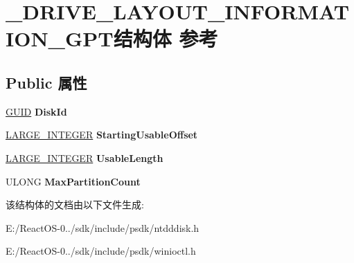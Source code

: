 \hypertarget{struct___d_r_i_v_e___l_a_y_o_u_t___i_n_f_o_r_m_a_t_i_o_n___g_p_t}{}\section{\+\_\+\+D\+R\+I\+V\+E\+\_\+\+L\+A\+Y\+O\+U\+T\+\_\+\+I\+N\+F\+O\+R\+M\+A\+T\+I\+O\+N\+\_\+\+G\+P\+T结构体 参考}
\label{struct___d_r_i_v_e___l_a_y_o_u_t___i_n_f_o_r_m_a_t_i_o_n___g_p_t}
\subsection*{Public 属性}
\begin{DoxyCompactItemize}
\item 
\mbox{\label{struct___d_r_i_v_e___l_a_y_o_u_t___i_n_f_o_r_m_a_t_i_o_n___g_p_t_a7bca107718351bb967b793041e5ca1b5}} 
\hyperlink{interface_g_u_i_d}{G\+U\+ID} {\bfseries Disk\+Id}
\item 
\mbox{\label{struct___d_r_i_v_e___l_a_y_o_u_t___i_n_f_o_r_m_a_t_i_o_n___g_p_t_a176ac738bae36a2ea0d69f8e802d134c}} 
\hyperlink{union___l_a_r_g_e___i_n_t_e_g_e_r}{L\+A\+R\+G\+E\+\_\+\+I\+N\+T\+E\+G\+ER} {\bfseries Starting\+Usable\+Offset}
\item 
\mbox{\label{struct___d_r_i_v_e___l_a_y_o_u_t___i_n_f_o_r_m_a_t_i_o_n___g_p_t_a781462273cc3244befd8d2b3d7655671}} 
\hyperlink{union___l_a_r_g_e___i_n_t_e_g_e_r}{L\+A\+R\+G\+E\+\_\+\+I\+N\+T\+E\+G\+ER} {\bfseries Usable\+Length}
\item 
\mbox{\label{struct___d_r_i_v_e___l_a_y_o_u_t___i_n_f_o_r_m_a_t_i_o_n___g_p_t_ad643b23d73af43b723ab3bcd26dab312}} 
U\+L\+O\+NG {\bfseries Max\+Partition\+Count}
\end{DoxyCompactItemize}


该结构体的文档由以下文件生成\+:\begin{DoxyCompactItemize}
\item 
E\+:/\+React\+O\+S-\/0../sdk/include/psdk/ntdddisk.\+h\item 
E\+:/\+React\+O\+S-\/0../sdk/include/psdk/winioctl.\+h\end{DoxyCompactItemize}

